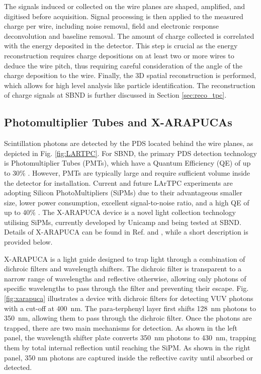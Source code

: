The signals induced or collected on the wire planes are shaped, amplified, and digitised before acquisition.
Signal processing is then applied to the measured charge per wire, including noise removal, field and electronic response deconvolution and baseline removal.
The amount of charge collected is correlated with the energy deposited in the detector.
This step is crucial as the energy reconstruction requires charge depositions on at least two or more wires to deduce the wire pitch, thus requiring careful consideration of the angle of
 the charge deposition to the wire.
Finally, the 3D spatial reconstruction is performed, which allows for high level analysis like particle identification.
The reconstruction of charge signals at SBND is further discussed in Section \ref{sec:reco_tpc}.

\subsection{Photomultiplier Tubes and X-ARAPUCAs}
\label{sec:pmtarapuca}

Scintillation photons are detected by the PDS located behind the wire planes, as depicted in Fig. \ref{fig:LARTPC}. 
For SBND, the primary PDS detection technology is Photomultiplier Tubes (PMTs), which have a Quantum Efficiency (QE) of up to 30\% \cite{pmt_qe}.
However, PMTs are typically large and require sufficient volume inside the detector for installation. 
Current and future LArTPC experiments are adopting Silicon PhotoMultipliers (SiPMs) due to their advantageous smaller size, lower power consumption, excellent signal-to-noise ratio, and a high QE of up to 40\% \cite{PatrickPhD, sipm_qe}.
The X-ARAPUCA device is a novel light collection technology utilising SiPMs, currently developed by Unicamp and being tested at SBND. 
Details of X-ARAPUCA can be found in Ref. \cite{xarapuca} and \cite{sbnd_pds_paper}, while a short description is provided below.

X-ARAPUCA is a light guide designed to trap light through a combination of dichroic filters and wavelength shifters.
The dichroic filter is transparent to a narrow range of wavelengths and reflective otherwise, allowing only photons of specific wavelengths to pass through the filter and preventing their escape.
Fig. \ref{fig:xarapuca} illustrates a device with dichroic filters for detecting VUV photons with a cut-off at 400~nm.
The para-terphenyl layer first shifts 128~nm photons to 350~nm, allowing them to pass through the dichroic filter.
Once the photons are trapped, there are two main mechanisms for detection.
As shown in the left panel, the wavelength shifter plate converts 350~nm photons to 430~nm, trapping them by total internal reflection until reaching the SiPM.
As shown in the right panel, 350 nm photons are captured inside the reflective cavity until absorbed or detected.

